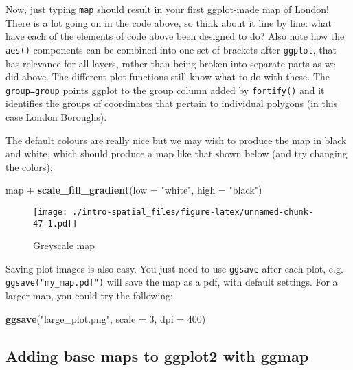 \documentclass[]{article}
\newenvironment{Shaded}{}{}
\newcommand{\KeywordTok}[1]{\textcolor[rgb]{0.00,0.44,0.13}{\textbf{{#1}}}}
\newcommand{\DataTypeTok}[1]{\textcolor[rgb]{0.56,0.13,0.00}{{#1}}}
\newcommand{\DecValTok}[1]{\textcolor[rgb]{0.25,0.63,0.44}{{#1}}}
\newcommand{\StringTok}[1]{\textcolor[rgb]{0.25,0.44,0.63}{{#1}}}
\newcommand{\NormalTok}[1]{{#1}}
\begin{document}
Now, just typing \texttt{map} should result in your first ggplot-made
map of London! There is a lot going on in the code above, so think about
it line by line: what have each of the elements of code above been
designed to do? Also note how the \texttt{aes()} components can be
combined into one set of brackets after \texttt{ggplot}, that has
relevance for all layers, rather than being broken into separate parts
as we did above. The different plot functions still know what to do with
these. The \texttt{group=group} points ggplot to the group column added
by \texttt{fortify()} and it identifies the groups of coordinates that
pertain to individual polygons (in this case London Boroughs).

The default colours are really nice but we may wish to produce the map
in black and white, which should produce a map like that shown below
(and try changing the colors):

\begin{Shaded}
\begin{Highlighting}[]
\NormalTok{map +}\StringTok{ }\KeywordTok{scale_fill_gradient}\NormalTok{(}\DataTypeTok{low =} \StringTok{"white"}\NormalTok{, }\DataTypeTok{high =} \StringTok{"black"}\NormalTok{)}
\end{Highlighting}
\end{Shaded}

\begin{figure}[htbp]
\centering
\texttt{[image: ./intro-spatial\_files/figure-latex/unnamed-chunk-47-1.pdf]}
\caption{Greyscale map}
\end{figure}

Saving plot images is also easy. You just need to use \texttt{ggsave}
after each plot, e.g. \texttt{ggsave("my\_map.pdf")} will save the map
as a pdf, with default settings. For a larger map, you could try the
following:

\begin{Shaded}
\begin{Highlighting}[]
\KeywordTok{ggsave}\NormalTok{(}\StringTok{"large_plot.png"}\NormalTok{, }\DataTypeTok{scale =} \DecValTok{3}\NormalTok{, }\DataTypeTok{dpi =} \DecValTok{400}\NormalTok{)}
\end{Highlighting}
\end{Shaded}

\subsection{Adding base maps to ggplot2 with
ggmap}\label{adding-base-maps-to-ggplot2-with-ggmap}
\end{document}
